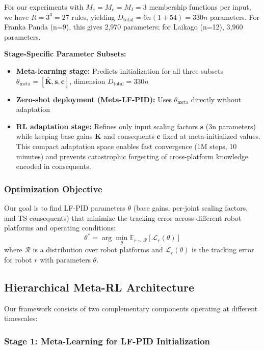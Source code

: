 \documentclass[DTMColor]{ROB-New}
\begin{document}
For our experiments with $M_e=M_{\dot e}=M_I=3$ membership functions per input, we have $R = 3^3 = 27$ rules, yielding $D_{\text{total}} = 6n(1+54) = 330n$ parameters. For Franka Panda (n=9), this gives 2,970 parameters; for Laikago (n=12), 3,960 parameters.

\textbf{Stage-Specific Parameter Subsets:}
\begin{itemize}[leftmargin=*, itemsep=2pt]
    \item \textbf{Meta-learning stage:} Predicts initialization for all three subsets $\theta_{\text{meta}} = [\bar{\bm{K}}, \bm{s}, \bm{c}]$, dimension $D_{\text{total}} = 330n$
    \item \textbf{Zero-shot deployment (Meta-LF-PID):} Uses $\theta_{\text{meta}}$ directly without adaptation
    \item \textbf{RL adaptation stage:} Refines only input scaling factors $\bm{s}$ (3n parameters) while keeping base gains $\bar{\bm{K}}$ and consequents $\bm{c}$ fixed at meta-initialized values. This compact adaptation space enables fast convergence (1M steps, 10 minutes) and prevents catastrophic forgetting of cross-platform knowledge encoded in consequents.
\end{itemize}

\subsubsection{Optimization Objective}

Our goal is to find LF-PID parameters $\theta$ (base gains, per-joint scaling factors, and TS consequents) that minimize the tracking error across different robot platforms and operating conditions:
\begin{equation}
    \theta^* = \arg\min_{\theta} \mathbb{E}_{r \sim \mathcal{R}} \left[ \mathcal{L}_r(\theta) \right]
\end{equation}
where $\mathcal{R}$ is a distribution over robot platforms and $\mathcal{L}_r(\theta)$ is the tracking error for robot $r$ with parameters $\theta$.

\subsection{Hierarchical Meta-RL Architecture}

Our framework consists of two complementary components operating at different timescales:

\subsubsection{Stage 1: Meta-Learning for LF-PID Initialization}
\end{document}
